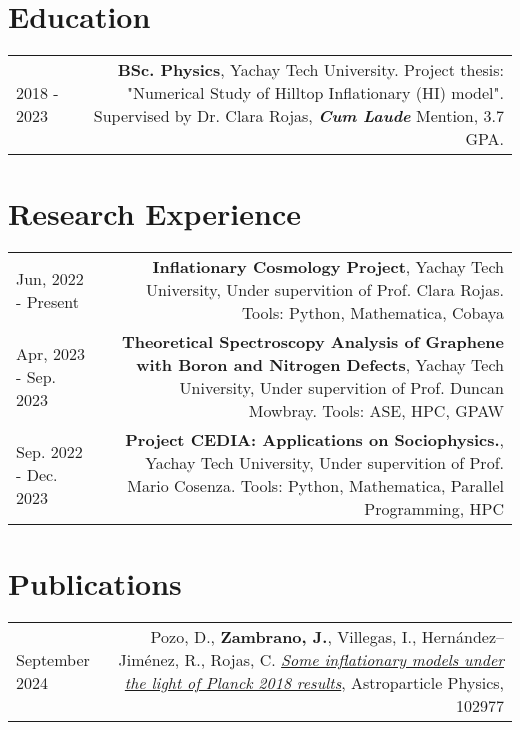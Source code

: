 \documentclass{article}
\begin{document}
\section*{Education}
\begin{tabular}{L!{\vrule}R}
	2018 - 2023 & \textbf{BSc. Physics}, Yachay Tech University. Project thesis: "Numerical Study of Hilltop Inflationary (HI) model". Supervised by Dr. Clara Rojas, \textbf{\textit{Cum Laude}} Mention, 3.7 GPA. \\
\end{tabular}

\section*{Research Experience}

\begin{tabular}{L!{\vrule}R}
    Jun, 2022 - Present   & \textbf{Inflationary Cosmology Project}, Yachay Tech University, Under supervition of Prof. Clara Rojas. Tools: Python, Mathematica, Cobaya \\
    Apr, 2023 - Sep. 2023  & \textbf{Theoretical Spectroscopy Analysis of Graphene with Boron and Nitrogen Defects}, Yachay Tech University, Under supervition of Prof. Duncan Mowbray. Tools: ASE, HPC, GPAW \\
    Sep. 2022 - Dec. 2023  & \textbf{Project CEDIA: Applications on Sociophysics.}, Yachay Tech University, Under supervition of Prof. Mario Cosenza. Tools: Python, Mathematica, Parallel Programming, HPC \\
    
\end{tabular}


\section*{Publications}

\begin{tabular}{L!{\vrule}R}
    September 2024 & 
    Pozo, D., \textbf{Zambrano, J.}, Villegas, I., Hernández–Jiménez, R., Rojas, C.
    \href{https://ui.adsabs.harvard.edu/abs/2024APh...16102977P/}{\textit{Some inflationary models under the light of Planck 2018 results}},
    Astroparticle Physics, 102977 \\
\end{tabular}
\end{document}
